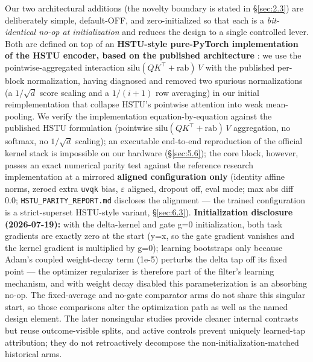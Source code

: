 Our two architectural additions (the novelty boundary is stated in \S\ref{sec:2.3}) are deliberately simple, default-OFF, and zero-initialized so that each is a \emph{bit-identical no-op at initialization} and reduces the design to a single controlled lever. Both are defined on top of an \textbf{HSTU-style pure-PyTorch implementation of the HSTU encoder, based on the published architecture} \citep{zhai2024hstu}: we use the pointwise-aggregated interaction $\mathrm{silu}(QK^{\top} + \mathrm{rab})\,V$ with the published per-block normalization, having diagnosed and removed two spurious normalizations (a $1/\sqrt{d}$ score scaling and a $1/(i{+}1)$ row averaging) in our initial reimplementation that collapse HSTU's pointwise attention into weak mean-pooling. We verify the implementation equation-by-equation against the published HSTU formulation (pointwise $\mathrm{silu}(QK^{\top} + \mathrm{rab})\,V$ aggregation, no softmax, no $1/\sqrt{d}$ scaling); an executable end-to-end reproduction of the official kernel stack is impossible on our hardware (\S\ref{sec:5.6}); the core block, however, passes an exact numerical parity test against the reference research implementation at a mirrored \textbf{aligned configuration only} (identity affine norms, zeroed extra \texttt{uvqk} bias, \ensuremath{\varepsilon} aligned, dropout off, eval mode; max abs diff 0.0; \texttt{HSTU\_PARITY\_REPORT.md} discloses the alignment --- the trained configuration is a strict-superset HSTU-style variant, \S\ref{sec:6.3}). \textbf{Initialization disclosure (2026-07-19):} with the delta-kernel and gate g=0 initialization, both task gradients are exactly zero at the start (y=x, so the gate gradient vanishes and the kernel gradient is multiplied by g=0); learning bootstraps only because Adam's coupled weight-decay term (1e-5) perturbs the delta tap off its fixed point --- the optimizer regularizer is therefore part of the filter's learning mechanism, and with weight decay disabled this parameterization is an absorbing no-op. The fixed-average and no-gate comparator arms do not share this singular start, so those comparisons alter the optimization path as well as the named design element. The later nonsingular studies provide cleaner internal contrasts but reuse outcome-visible splits, and active controls prevent uniquely learned-tap attribution; they do not retroactively decompose the non-initialization-matched historical arms.

